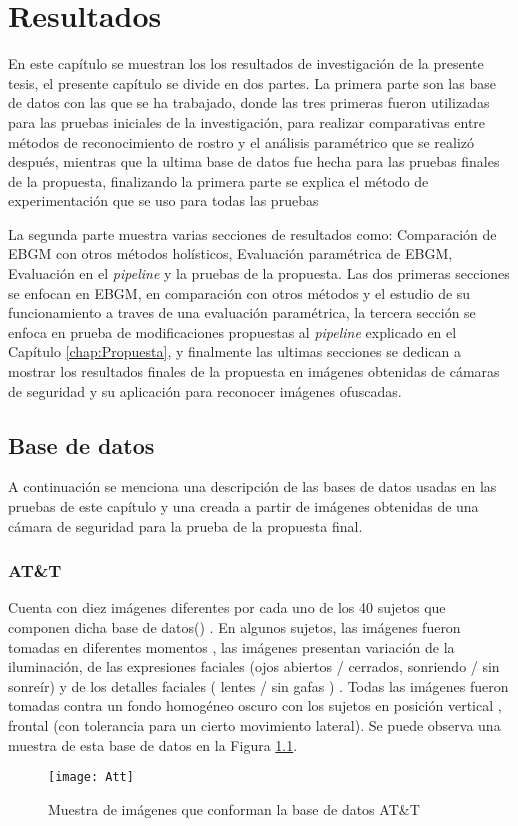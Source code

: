 \chapter{Resultados} \label{chap:Resultados}


En este capítulo se muestran los los resultados de investigación de la presente tesis, el presente capítulo se divide en dos partes. La primera parte son las base de datos con las que se ha trabajado, donde las tres primeras fueron utilizadas para las pruebas iniciales de la investigación, para realizar comparativas entre métodos de reconocimiento de rostro y el análisis paramétrico que se realizó después, mientras que la ultima base de datos fue hecha para las pruebas finales de la propuesta, finalizando la primera parte se explica el método de experimentación que se uso para todas las pruebas


La segunda parte muestra varias secciones de resultados como: Comparación de \ac{EBGM} con otros métodos holísticos, Evaluación paramétrica de \ac{EBGM}, Evaluación en el \textit{pipeline} y la pruebas de la propuesta. Las dos primeras secciones se enfocan en \ac{EBGM}, en comparación con otros métodos y el estudio de su funcionamiento a traves de una evaluación paramétrica, la tercera sección se enfoca en prueba de modificaciones propuestas al \textit{pipeline} explicado en el Capítulo \ref{chap:Propuesta}, y finalmente las ultimas secciones se dedican a mostrar los resultados finales de la propuesta en imágenes obtenidas de cámaras de seguridad y su aplicación para reconocer imágenes ofuscadas.

\section{Base de datos}
A continuación se menciona una descripción de las bases de datos usadas en las pruebas de este capítulo y una creada a partir de imágenes obtenidas de una cámara de seguridad para la prueba de la propuesta final.
\subsection{AT\&T}
Cuenta con diez imágenes diferentes por cada uno de los 40 sujetos que componen dicha base de datos(\cite{ATT})  . En algunos sujetos, las imágenes fueron tomadas en diferentes momentos , las imágenes presentan variación de la iluminación, de las expresiones faciales (ojos abiertos / cerrados, sonriendo / sin sonreír) y de los detalles faciales ( lentes / sin gafas ) . Todas las imágenes fueron tomadas contra un fondo homogéneo oscuro con los sujetos en posición vertical , frontal (con tolerancia para un cierto movimiento lateral). Se puede observa una muestra de esta base de datos en la Figura \ref{Att}.
\begin{figure}[h]
	\centering
	\texttt{[image: Att]}
    \caption{Muestra de imágenes que conforman la base de datos AT\&T}
    \label{Att}
\end{figure}
